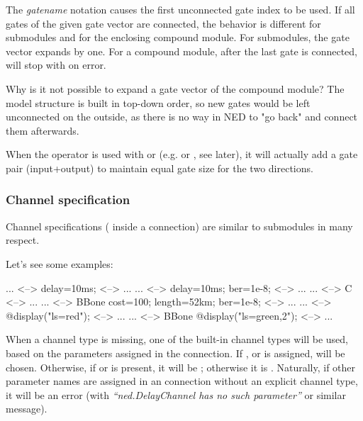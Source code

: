 The \textit{gatename}\ttt{++} notation causes the first unconnected gate index
to be used. If all gates of the given gate vector are connected, the behavior
is different for submodules and for the enclosing compound module.
For submodules, the gate vector expands by one. For a compound module,
after the last gate is connected, \ttt{++} will stop with on error.

\begin{note}
    Why is it not possible to expand a gate vector of the compound
    module? The model structure is built in top-down order, so new gates
    would be left unconnected on the outside, as there is no way in NED to
    "go back" and connect them afterwards.
\end{note}

When the \ttt{++} operator is used with  or 
(e.g.  or , see later), it will actually add
a gate pair (input+output) to maintain equal gate size for the two
directions.



\subsubsection{Channel specification}

Channel specifications ( inside a connection)
are similar to submodules in many respect.

Let's see some examples:

\begin{ned}
... <--> {delay=10ms;} <--> ...
... <--> {delay=10ms; ber=1e-8;} <--> ...
... <--> C <--> ...
... <--> BBone {cost=100; length=52km; ber=1e-8;} <--> ...
... <--> {@display("ls=red");} <--> ...
... <--> BBone {@display("ls=green,2");} <--> ...
\end{ned}


When a channel type is missing, one of the built-in channel types will be
used, based on the parameters assigned in the connection. If
,  or  is assigned,
 will be chosen. Otherwise, if  or
 is present, it will be ; otherwise it
is . Naturally, if other parameter names are
assigned in an connection without an explicit channel type, it will be an error
(with \textit{``ned.DelayChannel has no such parameter''} or similar message).


